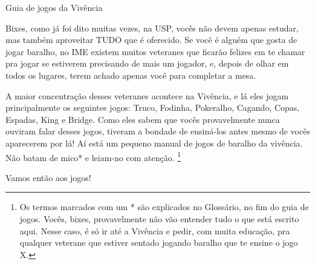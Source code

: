 \begin{secao}{Guia de jogos da Vivência }

Bixes, como já foi dito muitas vezes, na USP, vocês não devem apenas estudar, mas
também aproveitar TUDO que é oferecido. Se você é alguém que gosta de jogar
baralho, no IME existem muitos veteranes que ficarão felizes em te chamar pra
jogar se estiverem precisando de mais um jogador, e, depois de olhar em todos
os lugares, terem achado apenas você para completar a mesa. 

A maior concentração desses veteranes acontece na Vivência, e lá eles jogam
principalmente os seguintes jogos: Truco, Fodinha, Pokeralho, Cagando, Copas, Espadas,
King e Bridge. Como eles sabem que vocês provavelmente nunca ouviram falar desses jogos,
tiveram a bondade de ensiná-los antes mesmo de vocês aparecerem por lá! Aí está um
pequeno manual de jogos de baralho da vivência. Não batam de mico* e
leiam-no com atenção. \footnote{Os termos marcados com um * são explicados no Glossário, no fim do guia de
jogos. Vocês, bixes, provavelmente não vão entender tudo o que está escrito aqui.
Nesse caso, é só ir até a Vivência e pedir, com muita educação, pra qualquer 
veterane que estiver sentado jogando baralho que te ensine o jogo X.}

Vamos então aos jogos!






\pagebreak

\pagebreak




\end{secao}
